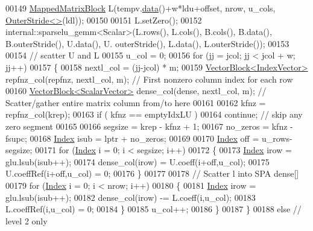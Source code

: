 \begin{DoxyCode}
00149       \hyperlink{group___core___module_class_eigen_1_1_map}{MappedMatrixBlock} L(tempv.\hyperlink{class_eigen_1_1_plain_object_base_ac25699535374b1854cf8494e44ad31b2}{data}()+w*ldu+offset, nrow, u\_cols, 
      \hyperlink{class_eigen_1_1_outer_stride}{OuterStride<>}(ldl));
00150       
00151       L.setZero();
00152       internal::sparselu\_gemm<Scalar>(L.rows(), L.cols(), B.cols(), B.data(), B.outerStride(), U.data(), U.
      outerStride(), L.data(), L.outerStride());
00153       
00154       \textcolor{comment}{// scatter U and L}
00155       u\_col = 0;
00156       \textcolor{keywordflow}{for} (jj = jcol; jj < jcol + w; jj++)
00157       \{
00158         nextl\_col = (jj-jcol) * m; 
00159         \hyperlink{group___core___module_class_eigen_1_1_vector_block}{VectorBlock<IndexVector>} repfnz\_col(repfnz, nextl\_col, m); \textcolor{comment}{// First nonzero
       column index for each row}
00160         \hyperlink{group___core___module_class_eigen_1_1_vector_block}{VectorBlock<ScalarVector>} dense\_col(dense, nextl\_col, m); \textcolor{comment}{//
       Scatter/gather entire matrix column from/to here}
00161         
00162         kfnz = repfnz\_col(krep); 
00163         \textcolor{keywordflow}{if} ( kfnz == emptyIdxLU ) 
00164           \textcolor{keywordflow}{continue}; \textcolor{comment}{// skip any zero segment}
00165         
00166         segsize = krep - kfnz + 1;
00167         no\_zeros = kfnz - fsupc; 
00168         \hyperlink{namespace_eigen_a62e77e0933482dafde8fe197d9a2cfde}{Index} isub = lptr + no\_zeros;
00169         
00170         \hyperlink{namespace_eigen_a62e77e0933482dafde8fe197d9a2cfde}{Index} off = u\_rows-segsize;
00171         \textcolor{keywordflow}{for} (\hyperlink{namespace_eigen_a62e77e0933482dafde8fe197d9a2cfde}{Index} i = 0; i < segsize; i++)
00172         \{
00173           \hyperlink{namespace_eigen_a62e77e0933482dafde8fe197d9a2cfde}{Index} irow = glu.lsub(isub++); 
00174           dense\_col(irow) = U.coeff(i+off,u\_col);
00175           U.coeffRef(i+off,u\_col) = 0;
00176         \}
00177         
00178         \textcolor{comment}{// Scatter l into SPA dense[]}
00179         \textcolor{keywordflow}{for} (\hyperlink{namespace_eigen_a62e77e0933482dafde8fe197d9a2cfde}{Index} i = 0; i < nrow; i++)
00180         \{
00181           \hyperlink{namespace_eigen_a62e77e0933482dafde8fe197d9a2cfde}{Index} irow = glu.lsub(isub++); 
00182           dense\_col(irow) -= L.coeff(i,u\_col);
00183           L.coeffRef(i,u\_col) = 0;
00184         \}
00185         u\_col++;
00186       \}
00187     \}
00188     \textcolor{keywordflow}{else} \textcolor{comment}{// level 2 only}

\end{DoxyCode}

